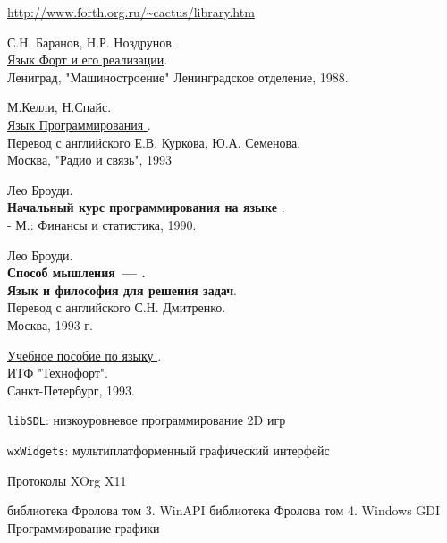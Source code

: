 \clearpage
{}\secdown

\begin{thebibliography}{99}

\secrel{\F}

    \url{http://www.forth.org.ru/~cactus/library.htm}

    С.Н. Баранов, Н.Р. Ноздрунов.\\
    \href{http://www.forth.org.ru/~cactus/files/baranov2.rar}{Язык Форт и его реализации}.\\
    Лениград, "Машиностроение" Ленинградское отделение, 1988.

    М.Келли, Н.Спайс.\\
    \href{http://www.forth.org.ru/~cactus/files/kelly.rar}{Язык Программирования \F}.\\
    Перевод с английского Е.В. Куркова, Ю.А. Семенова.\\
    Москва, "Радио и связь", 1993

    Лео Броуди.\\
    \textbf{Начальный курс программирования на языке \F}.\\
    - М.: Финансы и статистика, 1990.

    Лео Броуди.\\
    \textbf{Способ мышления\ --- \F.\\Язык и философия для решения задач}.\\
    Перевод с английского С.Н. Дмитренко.\\
    Москва, 1993 г.

    \href{http://www.forth.org.ru/~TechnoForth/book.rar}{Учебное пособие по языку \F}.\\
    ИТФ "Технофорт".\\
    Санкт-Петербург, 1993.


 \verb|libSDL|: низкоуровневое программирование 2D игр

 \verb|wxWidgets|: мультиплатформенный графический интерфейс

\secrel{\lin}

 Протоколы XOrg X11

\secrel{\win}

библиотека Фролова том 3. WinAPI
библиотека Фролова том 4. Windows GDI Программирование графики


\end{thebibliography}
